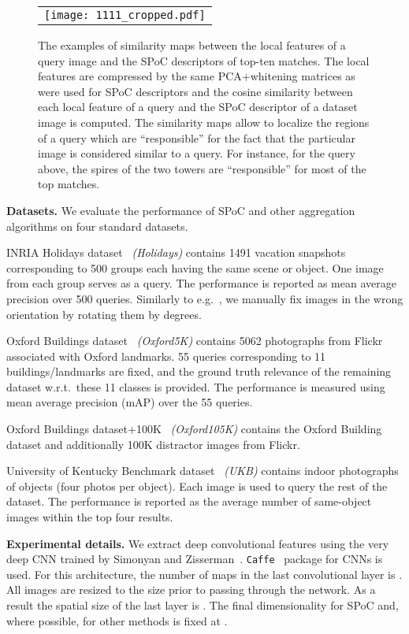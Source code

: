\begin{figure*}
\centering
\begin{tabular}{c}
\texttt{[image: 1111\_cropped.pdf]}
\end{tabular}
\caption{The examples of similarity maps between the local features of a query image and the SPoC descriptors of top-ten matches. The local features are compressed by the same PCA+whitening matrices as were used for SPoC descriptors and the cosine similarity between each local feature of a query and the SPoC descriptor of a dataset image is computed. The similarity maps allow to localize the regions of a query which are ``responsible'' for the fact that the particular image is considered similar to a query. For instance, for the query above, the spires of the two towers are ``responsible'' for most of the top matches.}
\label{fig:localSimilarities}
\end{figure*}

{\bf Datasets.} We evaluate the performance of SPoC and other aggregation algorithms on four standard datasets.

INRIA Holidays dataset~\cite{Holidays} {\em (Holidays)} contains 1491 vacation snapshots corresponding to 500 groups each having the same scene or object. One image from each group serves as a query. The performance is reported as mean average precision over 500 queries. Similarly to e.g.~\cite{Babenko14}, we manually fix images in the wrong orientation by rotating them by  degrees.

Oxford Buildings dataset~\cite{Philbin07} {\em (Oxford5K)} contains 5062 photographs from Flickr associated with Oxford landmarks. 55 queries corresponding to 11 buildings/landmarks are fixed, and the ground truth relevance of the remaining dataset w.r.t.\ these 11 classes is provided. The performance is measured using mean average precision (mAP) over the 55 queries.

Oxford Buildings dataset+100K~\cite{Philbin07} {\em (Oxford105K)} contains the Oxford Building dataset and additionally 100K distractor images from Flickr.

University of Kentucky Benchmark dataset~\cite{Nister06} {\em (UKB)} contains  indoor photographs of  objects (four photos per object). Each image is used to query the rest of the dataset. The performance is reported as the average number of same-object images within the top four results.

{\bf Experimental details.} We extract deep convolutional features using the very deep CNN trained by Simonyan and Zisserman~\cite{Simonyan14}. {\tt Caffe}~\cite{Caffe} package for CNNs is used. For this architecture, the number of maps in the last convolutional layer is . All images are resized to the size  prior to passing through the network. As a result the spatial size of the last layer is . The final dimensionality for SPoC and, where possible, for other methods is fixed at . 


